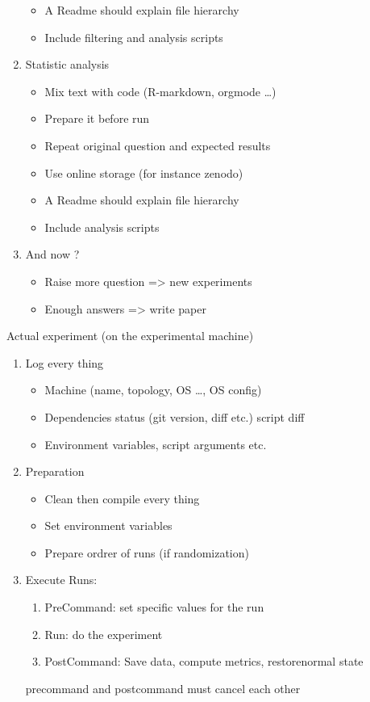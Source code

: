 \begin{enumerate}
\begin{itemize}
            \item A Readme should explain file hierarchy
            \item Include filtering and analysis scripts
        \end{itemize}
    \item Statistic analysis
        \begin{itemize}
            \item Mix text with code (R-markdown, orgmode \ldots)
            \item Prepare it before run
            \item Repeat original question and expected results
            \item Use online storage (for instance zenodo)
            \item A Readme should explain file hierarchy
            \item Include analysis scripts
        \end{itemize}
    \item And now ?
        \begin{itemize}
            \item Raise more question => new experiments
            \item Enough answers => write paper
        \end{itemize}
\end{enumerate}

Actual experiment (on the experimental machine)
\begin{enumerate}
    \item Log every thing
        \begin{itemize}
            \item Machine (name, topology, OS \ldots, OS
                config)
            \item Dependencies status (git version, diff etc.)
                script diff
            \item Environment variables, script arguments etc.
        \end{itemize}
    \item Preparation
        \begin{itemize}
            \item Clean then compile every thing
            \item Set environment variables
            \item Prepare ordrer of runs (if randomization)
        \end{itemize}
    \item Execute Runs:
        \begin{enumerate}
            \item PreCommand: set specific values for the run
            \item Run: do the experiment
            \item PostCommand: Save data, compute metrics,
                restorenormal state
        \end{enumerate}
        precommand and postcommand must cancel each other
\end{enumerate}

